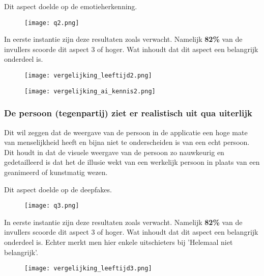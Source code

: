 Dit aspect doelde op de emotieherkenning.

\begin{figure}[htbp]
    \centering
    \texttt{[image: q2.png]}
    \label{fig:vraag_2_resultaat}
\end{figure}

In eerste instantie zijn deze resultaten zoals verwacht. Namelijk \textbf{82\%} van de invullers scoorde dit aspect 3 of hoger. Wat inhoudt dat dit aspect een belangrijk onderdeel is.

\begin{figure}[htbp]
    \centering
    \texttt{[image: vergelijking\_leeftijd2.png]}
    \label{fig:vergelijking_leeftijd2}
\end{figure}

\begin{figure}[htbp]
    \centering
    \texttt{[image: vergelijking\_ai\_kennis2.png]}
    \label{fig:vergelijking_ai_kennis2}
\end{figure}

\subsubsection{De persoon (tegenpartij) ziet er realistisch uit qua uiterlijk}

Dit wil zeggen dat de weergave van de persoon in de applicatie een hoge mate van menselijkheid heeft en bijna niet te onderscheiden is van een echt persoon. Dit houdt in dat de visuele weergave van de persoon zo nauwkeurig en gedetailleerd is dat het de illusie wekt van een werkelijk persoon in plaats van een geanimeerd of kunstmatig wezen.

Dit aspect doelde op de deepfakes.

\begin{figure}[htbp]
    \centering
    \texttt{[image: q3.png]}
    \label{fig:vraag_3_resultaat}
\end{figure}

In eerste instantie zijn deze resultaten zoals verwacht. Namelijk \textbf{82\%} van de invullers scoorde dit aspect 3 of hoger. Wat inhoudt dat dit aspect een belangrijk onderdeel is. Echter merkt men hier enkele uitschieters bij 'Helemaal niet belangrijk'.

\begin{figure}[htbp]
    \centering
    \texttt{[image: vergelijking\_leeftijd3.png]}
    \label{fig:vergelijking_leeftijd3}
\end{figure}

